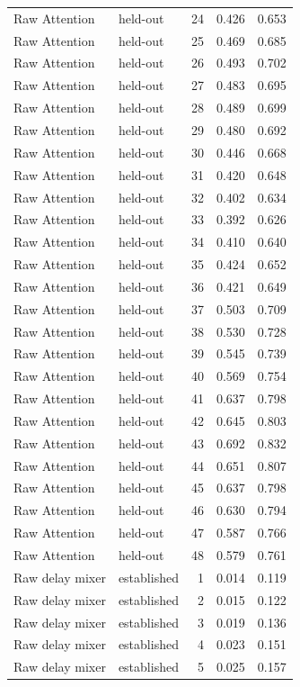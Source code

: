 \begin{tabular}{llrrr}
Raw Attention & held-out & 24 & 0.426 & 0.653 \\
Raw Attention & held-out & 25 & 0.469 & 0.685 \\
Raw Attention & held-out & 26 & 0.493 & 0.702 \\
Raw Attention & held-out & 27 & 0.483 & 0.695 \\
Raw Attention & held-out & 28 & 0.489 & 0.699 \\
Raw Attention & held-out & 29 & 0.480 & 0.692 \\
Raw Attention & held-out & 30 & 0.446 & 0.668 \\
Raw Attention & held-out & 31 & 0.420 & 0.648 \\
Raw Attention & held-out & 32 & 0.402 & 0.634 \\
Raw Attention & held-out & 33 & 0.392 & 0.626 \\
Raw Attention & held-out & 34 & 0.410 & 0.640 \\
Raw Attention & held-out & 35 & 0.424 & 0.652 \\
Raw Attention & held-out & 36 & 0.421 & 0.649 \\
Raw Attention & held-out & 37 & 0.503 & 0.709 \\
Raw Attention & held-out & 38 & 0.530 & 0.728 \\
Raw Attention & held-out & 39 & 0.545 & 0.739 \\
Raw Attention & held-out & 40 & 0.569 & 0.754 \\
Raw Attention & held-out & 41 & 0.637 & 0.798 \\
Raw Attention & held-out & 42 & 0.645 & 0.803 \\
Raw Attention & held-out & 43 & 0.692 & 0.832 \\
Raw Attention & held-out & 44 & 0.651 & 0.807 \\
Raw Attention & held-out & 45 & 0.637 & 0.798 \\
Raw Attention & held-out & 46 & 0.630 & 0.794 \\
Raw Attention & held-out & 47 & 0.587 & 0.766 \\
Raw Attention & held-out & 48 & 0.579 & 0.761 \\
Raw delay mixer & established & 1 & 0.014 & 0.119 \\
Raw delay mixer & established & 2 & 0.015 & 0.122 \\
Raw delay mixer & established & 3 & 0.019 & 0.136 \\
Raw delay mixer & established & 4 & 0.023 & 0.151 \\
Raw delay mixer & established & 5 & 0.025 & 0.157 \\

\end{tabular}
